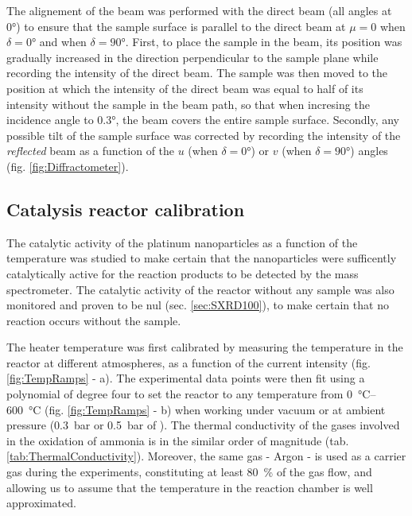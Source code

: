 The alignement of the beam was performed with the direct beam (all angles at \ang{0}) to ensure that the sample surface is parallel to the direct beam at $\mu=0$ when $\delta = \ang{0}$ and when $\delta = \ang{90}$.
First, to place the sample in the beam, its position was gradually increased in the direction perpendicular to the sample plane while recording the intensity of the direct beam.
The sample was then moved to the position at which the intensity of the direct beam was equal to half of its intensity without the sample in the beam path, so that when incresing the incidence angle to \ang{0.3}, the beam covers the entire sample surface.
Secondly, any possible tilt of the sample surface was corrected by recording the intensity of the \textit{reflected} beam as a function of the $u$ (when $\delta=\ang{0}$) or $v$ (when $\delta=\ang{90}$) angles (fig. \ref{fig:Diffractometer}).

\subsection{Catalysis reactor calibration}

The catalytic activity of the platinum nanoparticles as a function of the temperature was studied to make certain that the nanoparticles were sufficently catalytically active for the reaction products to be detected by the mass spectrometer.
The catalytic activity of the reactor without any sample was also monitored and proven to be nul (sec. \ref{sec:SXRD100}), to make certain that no reaction occurs without the sample.

The heater temperature was first calibrated by measuring the temperature in the reactor at different atmospheres, as a function of the current intensity (fig. \ref{fig:TempRamps} - a).
The experimental data points were then fit using a polynomial of degree four to set the reactor to any temperature from \qtyrange{0}{600}{\degreeCelsius} (fig. \ref{fig:TempRamps} - b) when working under vacuum or at ambient pressure (\qty{0.3}{\bar} or \qty{0.5}{\bar} of \argon).
The thermal conductivity of the gases involved in the oxidation of ammonia is in the similar order of magnitude (tab. \ref{tab:ThermalConductivity}).
Moreover, the same gas - Argon - is used as a carrier gas during the experiments, constituting at least \qty{80}{\percent} of the gas flow, and allowing us to assume that the temperature in the reaction chamber is well approximated.

